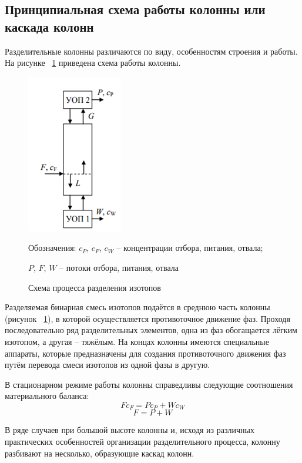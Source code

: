 \subsection{Принципиальная схема работы колонны или каскада колонн}
Разделительные колонны различаются по виду, особенностям строения и работы. 
На рисунке ~\ref{fig:cascade} приведена схема работы колонны.
\begin{figure}[hbtp]
    \centering
    \captionsetup{justification=centering}
    \includegraphics[scale=1]{latex/figures/figure1.png}
    \caption{Схема процесса разделения изотопов}
    Обозначения: $c_{P}$, $c_{F}$, $c_{W}$ – концентрации отбора, питания, отвала;
    
    $P$, $F$, $W$ – потоки отбора, питания, отвала
    \label{fig:cascade}
\end{figure}

Разделяемая бинарная смесь изотопов подаётся в среднюю часть колонны 
(рисунок ~\ref{fig:cascade}), в которой осуществляется противоточное движение фаз. 
Проходя последовательно ряд разделительных элементов, одна из фаз обогащается 
лёгким изотопом, а другая – тяжёлым. На концах колонны имеются специальные 
аппараты, которые предназначены для создания противоточного движения 
фаз путём перевода смеси изотопов из одной фазы в другую.

В стационарном режиме работы колонны справедливы следующие соотношения 
материального баланса:
\begin{equation}
    Fc_{F} = Pc_{P} + Wc_{W}
\end{equation}
\begin{equation}
    F = P + W
\end{equation}

В ряде случаев при большой высоте колонны и, исходя из различных практических 
особенностей организации разделительного процесса, колонну разбивают на 
несколько, образующие каскад колонн.
\newpage